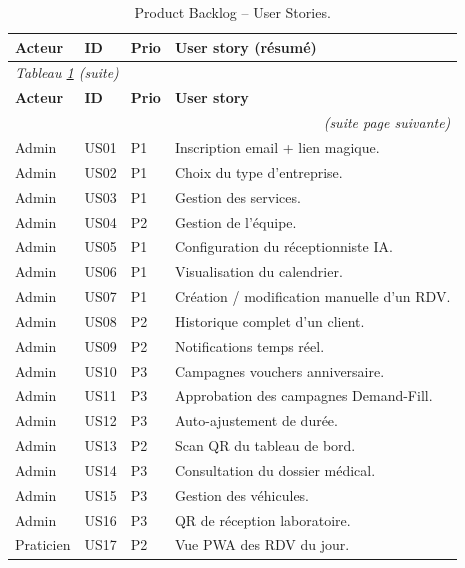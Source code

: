{\small
\begin{longtable}{|p{1.6cm}|p{1.4cm}|p{1.4cm}|p{8.5cm}|}
  \caption{Product Backlog -- User Stories.}\label{tab:backlog}\\
  \hline\hline
  \textbf{Acteur} & \textbf{ID} & \textbf{Prio} & \textbf{User story (résumé)} \\
  \hline
  \endfirsthead
  \multicolumn{4}{l}{\small\textit{Tableau \ref{tab:backlog} (suite)}}\\
  \hline\hline
  \textbf{Acteur} & \textbf{ID} & \textbf{Prio} & \textbf{User story} \\
  \hline
  \endhead
  \hline
  \multicolumn{4}{r}{\small\textit{(suite page suivante)}}\\
  \endfoot
  \hline\hline
  \endlastfoot
  Admin     & US01 & P1 & Inscription email + lien magique. \\
  \hline
  Admin     & US02 & P1 & Choix du type d'entreprise. \\
  \hline
  Admin     & US03 & P1 & Gestion des services. \\
  \hline
  Admin     & US04 & P2 & Gestion de l'équipe. \\
  \hline
  Admin     & US05 & P1 & Configuration du réceptionniste IA. \\
  \hline
  Admin     & US06 & P1 & Visualisation du calendrier. \\
  \hline
  Admin     & US07 & P1 & Création / modification manuelle d'un RDV. \\
  \hline
  Admin     & US08 & P2 & Historique complet d'un client. \\
  \hline
  Admin     & US09 & P2 & Notifications temps réel. \\
  \hline
  Admin     & US10 & P3 & Campagnes vouchers anniversaire. \\
  \hline
  Admin     & US11 & P3 & Approbation des campagnes Demand-Fill. \\
  \hline
  Admin     & US12 & P3 & Auto-ajustement de durée. \\
  \hline
  Admin     & US13 & P2 & Scan QR du tableau de bord. \\
  \hline
  Admin     & US14 & P3 & Consultation du dossier médical. \\
  \hline
  Admin     & US15 & P3 & Gestion des véhicules. \\
  \hline
  Admin     & US16 & P3 & QR de réception laboratoire. \\
  \hline
  Praticien & US17 & P2 & Vue PWA des RDV du jour. \\

\end{longtable}}
